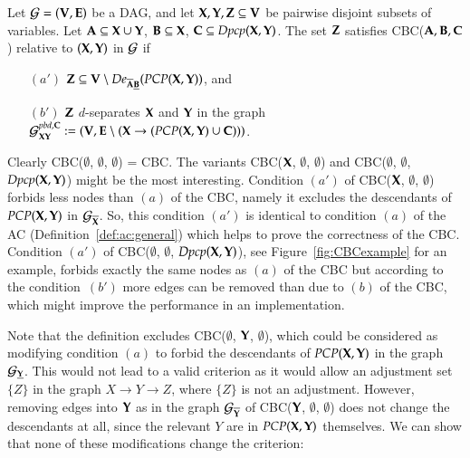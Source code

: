 \begin{definition}\label{def:ac:general:bdc:prime}
Let ${\cal G} = ({\bf V},{\bf E})$ be a DAG, and 
let ${\bf X},{\bf Y},{\bf Z} \subseteq {\bf V}$ be pairwise disjoint subsets of variables. 
Let ${\bf A} \subseteq {\bf X} \cup {\bf Y} $, ${\bf B} \subseteq {\bf X} $, ${\bf C} \subseteq \textit{Dpcp}({\bf X},{\bf Y})$.
The set ${\bf Z}$ satisfies CBC(${\bf A},{\bf B},{\bf C} $) %
relative to $({\bf X}, {\bf Y})$ in ${\cal G}$  if 
\begin{enumerate} 
  \item[$(a')$] ${\bf Z} \subseteq {\bf V} \setminus De_{\overline{{\bf A}}\underline{{\bf B}}}(\textit{PCP}({\bf X},{\bf Y}))$, and
\item[$(b')$] 
    ${\bf Z}$ $d$-separates ${\bf X}$ and ${\bf Y}$ in the graph ${\cal G}^{pbd,{\bf C}}_{{\bf X}{\bf Y}} := ({\bf V},{\bf E} \setminus ({\bf X} \to (\textit{PCP}({\bf X},{\bf Y}) \cup {\bf C}) ))$.
\end{enumerate}
\end{definition}

Clearly CBC($ \emptyset $, $ \emptyset $, $\emptyset$) = CBC.
The variants CBC($ {\bf X} $, $ \emptyset $, $\emptyset$) and 
CBC($ \emptyset $, $ \emptyset $, $\textit{Dpcp}({\bf X},{\bf Y})$) might be the most interesting.
Condition $ (a') $ of CBC($ {\bf X} $, $ \emptyset $, $\emptyset$) forbids less nodes than 
$(a)$ of the CBC, namely it excludes the descendants of $\textit{PCP}({\bf X},{\bf Y})$ in $ {\cal G}_{\overline{{\bf X}}} $. 
So, this condition $ (a') $ is identical to condition $ (a) $ of the AC (Definition~\ref{def:ac:general})
which helps to prove the correctness of the CBC.
Condition $ (a') $ of CBC($ \emptyset $, $ \emptyset $, $\textit{Dpcp}({\bf X},{\bf Y})$), see Figure~\ref{fig:CBCexample} for an example, 
forbids exactly the same nodes as $(a)$ of the CBC but according to the condition~$ (b') $ more edges 
can be removed than due to $(b)$ of the CBC, 
which might improve the performance in an implementation. %



Note that the definition excludes CBC($ \emptyset $, $ {\bf Y} $, $\emptyset $), which could be considered as modifying condition $(a)$ to forbid the descendants of $ \textit{PCP}({\bf X},{\bf Y}) $ in the graph $ {\cal G}_{\underline{{\bf Y}}}$. This would not lead to a valid criterion as it would allow an adjustment set $ \{Z\} $ in the graph $ X \to Y \to Z $, where $ \{Z\} $ is not an adjustment. However, removing edges into $ {\bf Y} $ as in the graph $ {\cal G}_{\overline{{\bf Y}}} $ of CBC($ {\bf Y} $, $ \emptyset $, $ \emptyset $) does not change the descendants at all, since the relevant $ Y $ are in $ \textit{PCP}({\bf X},{\bf Y}) $ themselves. We can show that none of these modifications change the criterion:


